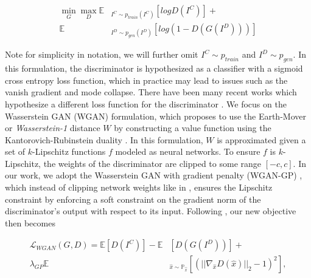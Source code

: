 \documentclass[letterpaper, 10pt, conference]{ieeeconf}
\begin{document}
\begin{equation}
\begin{aligned}
   \min\limits_{G}\max\limits_{D} \mathbb{E} & _{I^C \sim p_{train}(I^C)} [logD(I^C)] + \\
   \mathbb{E} & _{I^D \sim p_{gen}(I^D)}[log(1 - D(G(I^D)))]
\end{aligned}
\end{equation}

\noindent Note for simplicity in notation, we will further omit $I^C \sim p_{train}$ and $I^D \sim p_{gen}$. In this
formulation, the discriminator is hypothesized as a classifier with a sigmoid cross entropy loss function, which in
practice may lead to issues such as the vanish gradient and mode collapse. There have been many recent works which
hypothesize a different loss function for the discriminator
\cite{mao2016least,arjovsky2017wasserstein,gulrajani2017improved,zhao2016energy}. We focus on the Wasserstein GAN
(WGAN) \cite{arjovsky2017wasserstein} formulation, which proposes to use the Earth-Mover or \textit{Wasserstein-1}
distance $W$ by constructing a value function using the Kantorovich-Rubinstein duality \cite{villani2008optimal}.
In this formulation, $W$ is approximated given a set of $k$-Lipschitz functions $f$ modeled as neural networks. To
ensure $f$ is $k$-Lipschitz, the weights of the discriminator are clipped to some range $[-c, c]$. In our work, we
adopt the Wasserstein GAN with gradient penalty (WGAN-GP) \cite{gulrajani2017improved}, which instead of clipping
network weights like in \cite{arjovsky2017wasserstein}, ensures the Lipschitz constraint by enforcing a soft
constraint on the gradient norm of the discriminator's output with respect to its input. Following
\cite{gulrajani2017improved}, our new objective then becomes

\begin{equation}
\begin{aligned}
   \mathcal{L}_{WGAN}(G,D) = \mathbb{E} [D(I^C)] - \mathbb{E} & [D(G(I^D))] + \\
   \lambda_{GP} \mathbb{E} & _{\hat{x} \sim \mathbb{P}_{\hat{x}}} [(|| \nabla_{\hat{x}} D(\hat{x})||_2 -1)^2 ],
\end{aligned}
\end{equation}

\end{document}
